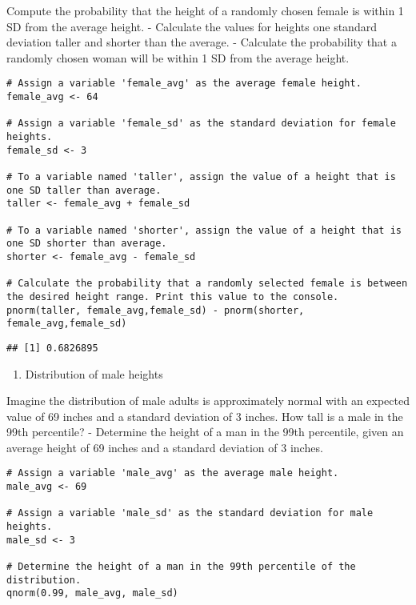 \documentclass[
]{article}
\providecommand{\tightlist}{%
  \setlength{\itemsep}{0pt}\setlength{\parskip}{0pt}}
\begin{document}
Compute the probability that the height of a randomly chosen female is
within 1 SD from the average height. - Calculate the values for heights
one standard deviation taller and shorter than the average. - Calculate
the probability that a randomly chosen woman will be within 1 SD from
the average height.

\begin{verbatim}
# Assign a variable 'female_avg' as the average female height.
female_avg <- 64

# Assign a variable 'female_sd' as the standard deviation for female heights.
female_sd <- 3

# To a variable named 'taller', assign the value of a height that is one SD taller than average.
taller <- female_avg + female_sd

# To a variable named 'shorter', assign the value of a height that is one SD shorter than average.
shorter <- female_avg - female_sd

# Calculate the probability that a randomly selected female is between the desired height range. Print this value to the console.
pnorm(taller, female_avg,female_sd) - pnorm(shorter, female_avg,female_sd)
\end{verbatim}

\begin{verbatim}
## [1] 0.6826895
\end{verbatim}

\begin{enumerate}
\def\labelenumi{\arabic{enumi}.}
\setcounter{enumi}{5}
\tightlist
\item
  Distribution of male heights
\end{enumerate}

Imagine the distribution of male adults is approximately normal with an
expected value of 69 inches and a standard deviation of 3 inches. How
tall is a male in the 99th percentile? - Determine the height of a man
in the 99th percentile, given an average height of 69 inches and a
standard deviation of 3 inches.

\begin{verbatim}
# Assign a variable 'male_avg' as the average male height.
male_avg <- 69

# Assign a variable 'male_sd' as the standard deviation for male heights.
male_sd <- 3

# Determine the height of a man in the 99th percentile of the distribution.
qnorm(0.99, male_avg, male_sd)
\end{verbatim}
\end{document}

